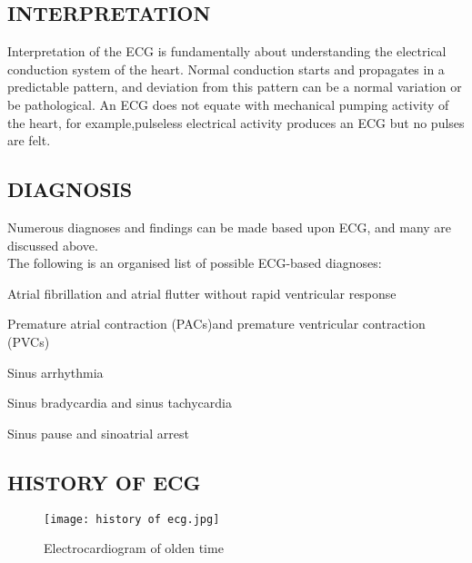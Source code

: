 \documentclass[12pt]{article}
\begin{document}
\subsection{INTERPRETATION}


{\large Interpretation of the ECG is fundamentally about understanding the electrical conduction system of the heart. Normal conduction starts and propagates in a predictable pattern, and deviation from this pattern can be a normal variation or be pathological. An ECG does not equate with mechanical pumping activity of the heart, for example,pulseless electrical activity produces an ECG but no pulses are felt.}





\subsection{DIAGNOSIS}


{\large Numerous diagnoses and findings can be made based upon ECG, and many are discussed above.\\The following is an organised list of possible ECG-based diagnoses:}


\begin{itemize}
{\large \item Atrial fibrillation and atrial flutter without rapid ventricular response
\item Premature atrial contraction (PACs)and premature ventricular contraction (PVCs)
\item Sinus arrhythmia
\item Sinus bradycardia and sinus tachycardia
\item Sinus pause and sinoatrial arrest}
\end{itemize}



\subsection{HISTORY OF ECG}


\begin{figure}[h]
\centering
\texttt{[image: history of ecg.jpg]}
\caption{Electrocardiogram of olden time}
\end{figure}
\end{document}
